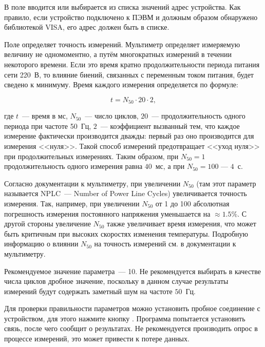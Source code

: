 В поле  вводится или выбирается из списка значений адрес устройства. Как правило, если устройство подключено к ПЭВМ и должным образом обнаружено библиотекой VISA, его адрес должен быть в списке.

Поле  определяет точность измерений. Мультиметр определяет измеряемую величину не одномоментно, а путём многократных измерений в течении некоторого времени. Если это время кратно продолжительности периода питания сети 220~В, то влияние биений, связанных с переменным током питания, будет сведено к минимуму. Время каждого измерения определяется по формуле:

\begin{equation}
t = N_{50} \cdot 20 \cdot 2,
\end{equation}

\noindent где $t$~--- время в мс, $N_{50}$~--- число циклов, $20$~--- продолжительность одного периода при частоте 50~Гц, $2$~--- коэффициент вызванный тем, что каждое измерение фактически производится дважды: первый раз оно производится для измерения <<нуля>>. Такой способ измерений предотвращает <<уход нуля>> при продолжительных измерениях. Таким образом, при $N_{50} = 1$ продолжительность одного измерения равна $40$~мс, а при $N_{50} = 100$ --- $4$~с.

Согласно документации к мультиметру, при увеличении $N_{50}$ (там этот параметр называется NPLC~--- Number of Power Line Cycles) увеличивается точность измерения. Так, например, при увеличении $N_{50}$ от 1 до 100 абсолютная погрешность измерения постоянного напряжения уменьшается на $\approx 1.5\%$. С другой стороны увеличение $N_{50}$ также увеличивает время измерения, что может быть критичным при высоких скоростях изменения температуры. Подробную информацию о влиянии $N_{50}$ на точность измерений см. в документации к мультиметру.

Рекомендуемое значение параметра~--- 10. Не рекомендуется выбирать в качестве числа циклов дробное значение, поскольку в данном случае результаты измерений будут содержать заметный шум на частоте $50$~Гц.


Для проверки правильности параметров можно установить пробное соединение с устройством, для этого нажмите кнопку . Программа попытается установить связь, после чего сообщит о результатах. Не рекомендуется производить опрос в процессе измерений, это может привести к потере данных.